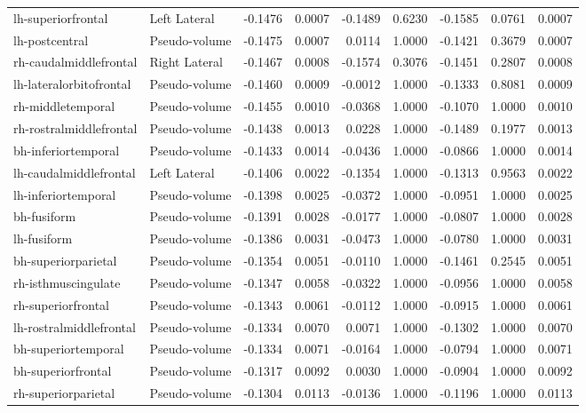 \documentclass{article}
\begin{document}
\begin{table}
\begin{tabular}{llrrrrrrr}
	lh-superiorfrontal & Left Lateral & -0.1476 & 0.0007 & -0.1489 & 0.6230 & -0.1585 & 0.0761 & 0.0007 \\
	lh-postcentral & Pseudo-volume & -0.1475 & 0.0007 & 0.0114 & 1.0000 & -0.1421 & 0.3679 & 0.0007 \\
	rh-caudalmiddlefrontal & Right Lateral & -0.1467 & 0.0008 & -0.1574 & 0.3076 & -0.1451 & 0.2807 & 0.0008 \\
	lh-lateralorbitofrontal & Pseudo-volume & -0.1460 & 0.0009 & -0.0012 & 1.0000 & -0.1333 & 0.8081 & 0.0009 \\
	rh-middletemporal & Pseudo-volume & -0.1455 & 0.0010 & -0.0368 & 1.0000 & -0.1070 & 1.0000 & 0.0010 \\
	rh-rostralmiddlefrontal & Pseudo-volume & -0.1438 & 0.0013 & 0.0228 & 1.0000 & -0.1489 & 0.1977 & 0.0013 \\
	bh-inferiortemporal & Pseudo-volume & -0.1433 & 0.0014 & -0.0436 & 1.0000 & -0.0866 & 1.0000 & 0.0014 \\
	lh-caudalmiddlefrontal & Left Lateral & -0.1406 & 0.0022 & -0.1354 & 1.0000 & -0.1313 & 0.9563 & 0.0022 \\
	lh-inferiortemporal & Pseudo-volume & -0.1398 & 0.0025 & -0.0372 & 1.0000 & -0.0951 & 1.0000 & 0.0025 \\
	bh-fusiform & Pseudo-volume & -0.1391 & 0.0028 & -0.0177 & 1.0000 & -0.0807 & 1.0000 & 0.0028 \\
	lh-fusiform & Pseudo-volume & -0.1386 & 0.0031 & -0.0473 & 1.0000 & -0.0780 & 1.0000 & 0.0031 \\
	bh-superiorparietal & Pseudo-volume & -0.1354 & 0.0051 & -0.0110 & 1.0000 & -0.1461 & 0.2545 & 0.0051 \\
	rh-isthmuscingulate & Pseudo-volume & -0.1347 & 0.0058 & -0.0322 & 1.0000 & -0.0956 & 1.0000 & 0.0058 \\
	rh-superiorfrontal & Pseudo-volume & -0.1343 & 0.0061 & -0.0112 & 1.0000 & -0.0915 & 1.0000 & 0.0061 \\
	lh-rostralmiddlefrontal & Pseudo-volume & -0.1334 & 0.0070 & 0.0071 & 1.0000 & -0.1302 & 1.0000 & 0.0070 \\
	bh-superiortemporal & Pseudo-volume & -0.1334 & 0.0071 & -0.0164 & 1.0000 & -0.0794 & 1.0000 & 0.0071 \\
	bh-superiorfrontal & Pseudo-volume & -0.1317 & 0.0092 & 0.0030 & 1.0000 & -0.0904 & 1.0000 & 0.0092 \\
	rh-superiorparietal & Pseudo-volume & -0.1304 & 0.0113 & -0.0136 & 1.0000 & -0.1196 & 1.0000 & 0.0113 \\

\end{tabular}
\end{table}
\end{document}
